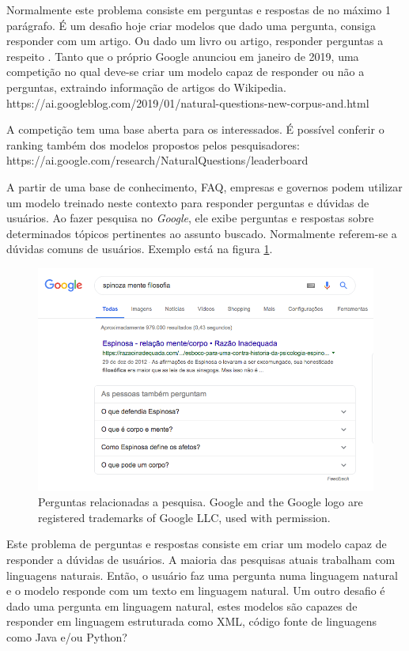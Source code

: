 Normalmente este problema consiste em perguntas e respostas de no máximo 1 parágrafo. É um desafio hoje criar modelos que dado uma pergunta, consiga responder com um artigo. Ou dado um livro ou artigo, responder perguntas a respeito . Tanto que o próprio Google anunciou em janeiro de 2019, uma competição no qual deve-se criar um modelo capaz de responder ou não a perguntas, extraindo informação de artigos do Wikipedia. https://ai.googleblog.com/2019/01/natural-questions-new-corpus-and.html

A competição tem uma base aberta para os interessados. É possível conferir o ranking também dos modelos propostos pelos pesquisadores: https://ai.google.com/research/NaturalQuestions/leaderboard


A partir de uma base de conhecimento, FAQ, empresas e governos podem utilizar um modelo treinado neste contexto para responder perguntas e dúvidas de usuários. Ao fazer pesquisa no \textit{Google}, ele exibe perguntas e respostas sobre determinados tópicos pertinentes ao assunto buscado. Normalmente referem-se a dúvidas comuns de usuários. Exemplo está na figura \ref{fig:busca-google}.

\begin{figure}[h]
\includegraphics[width=12cm]{src/figuras/cap-introducao/busca-google-pergunta-resposta.png}
\caption{Perguntas relacionadas a pesquisa. Google and the Google logo are registered trademarks of Google LLC, used with permission.}
\label{fig:busca-google}
\end{figure}

Este problema de perguntas e respostas consiste em criar um modelo capaz de responder a dúvidas de usuários. A maioria das pesquisas atuais trabalham com linguagens naturais. Então, o usuário faz uma pergunta numa linguagem natural e o modelo responde com um texto em linguagem natural. Um outro desafio é dado uma pergunta em linguagem natural, estes modelos são capazes de responder em linguagem estruturada como XML, código fonte de linguagens como Java e/ou Python? 








